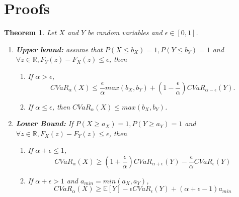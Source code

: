 \documentclass[letterpaper]{article} %
\newtheorem{theorem}{Theorem}[section]
\begin{document}
\section{Proofs}
\addtocounter{section}{1}
\begin{theorem}\label{thm:cvar_bound_v2}
	Let $X$ and $Y$ be random variables and $\epsilon \in [0, 1]$. 
	\begin{enumerate}
		\item \textbf{Upper bound:} assume that $P(X\leq b_X)=1, P(Y\leq b_Y)=1$ and $\forall z\in \mathbb{R},F_Y(z)-F_X(z)\leq \epsilon$, then 
		\begin{enumerate}
			\item If $\alpha > \epsilon$, \begin{equation}\label{eq:general_cvar_upper_bound_1}
				CVaR_\alpha(X) \leq \frac{\epsilon}{\alpha}max(b_X,b_Y) + (1 - \frac{\epsilon}{\alpha})CVaR_{\alpha-\epsilon}(Y).
			\end{equation}
			
			\item If $\alpha \leq \epsilon$, then $CVaR_\alpha(X)\leq max(b_X,b_Y)$.
		\end{enumerate}
		
		\item \textbf{Lower Bound:} If $P(X\geq a_X)=1, P(Y\geq a_Y)=1$ and $\forall z\in \mathbb{R},F_X(z)-F_Y(z)\leq \epsilon$, then
		\begin{enumerate}
			\item If $\alpha+\epsilon \leq 1$, \begin{equation}\label{eq:general_cvar_lower_bound_1}
				CVaR_{\alpha}(X)\geq (1+\frac{\epsilon}{\alpha})CVaR_{\alpha+\epsilon}(Y)-\frac{\epsilon}{\alpha} CVaR_{\epsilon}(Y)
			\end{equation}
			
			\item If $\alpha+\epsilon > 1$ and $a_{min} = min(a_X, a_Y)$, \begin{equation}
				CVaR_\alpha(X) \geq \mathbb{E}[Y] - \epsilon CVaR_\epsilon(Y) + (\alpha+\epsilon-1)a_{min}
			\end{equation}
		\end{enumerate}
	\end{enumerate}
\end{theorem}
\end{document}

